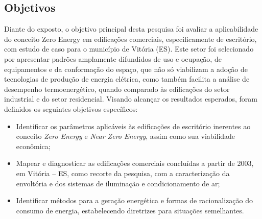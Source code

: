 \subsection{Objetivos}
\begin{onehalfspace}
Diante do exposto, o objetivo principal desta pesquisa foi avaliar 
a aplicabilidade do conceito Zero Energy  em  edificações  comerciais,  
especificamente  de  escritório,  com  estudo  de  caso  para  o 
município  de  Vitória  (ES).  Este  setor  foi  selecionado  por  
apresentar  padrões  amplamente difundidos  de  uso  e  ocupação,  
de  equipamentos  e  da  conformação  do  espaço,  que  não  
só viabilizam  a  adoção  de  tecnologias  de  produção  de  energia  
elétrica,  como  também  facilita  a análise de desempenho termoenergético, 
quando comparado às edificações do setor industrial e do setor residencial.\newline
Visando alcançar os resultados esperados, foram definidos os seguintes 
objetivos específicos:
\begin{itemize}
    \item Identificar os parâmetros aplicáveis às edificações de escritório 
    inerentes ao conceito \textit{Zero Energy} e \textit{Near Zero Energy}, assim como sua 
    viabilidade econômica;
    \item Mapear e diagnosticar as edificações comerciais concluídas a partir 
    de 2003, em Vitória – ES,  como  recorte  da  pesquisa,  com  a  
    caracterização  da  envoltória  e  dos  sistemas  de iluminação e 
    condicionamento de ar;
    \item Identificar métodos para a geração energética e formas de 
    racionalização do consumo de energia, estabelecendo diretrizes para 
    situações semelhantes.
\end{itemize}
\end{onehalfspace}